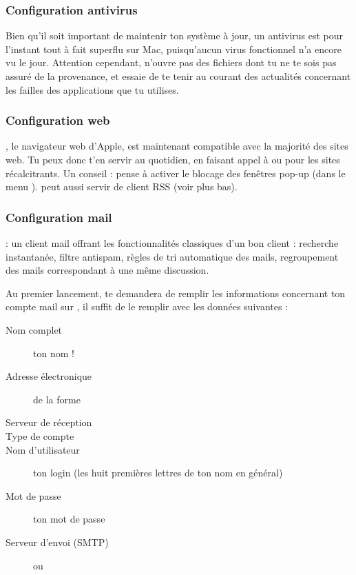
\subsubsection{Configuration antivirus}

Bien qu'il soit important de maintenir ton système à jour, un antivirus est pour l'instant tout à fait superflu sur Mac, puisqu'aucun virus fonctionnel n'a encore vu le jour. Attention cependant, n'ouvre pas des fichiers dont tu ne te sois pas assuré de la provenance, et essaie de te tenir au courant des actualités concernant les failles des applications que tu utilises.

\pagebreak

\subsubsection{Configuration web}

, le navigateur web d'Apple, est maintenant compatible avec la majorité des sites web. Tu peux donc t'en servir au quotidien, en faisant appel à  ou  pour les sites récalcitrants. Un conseil : pense à activer le blocage des fenêtres pop-up (dans le menu ).  peut aussi servir de client RSS (voir plus bas).\\

\pagebreak

\subsubsection{Configuration mail}
  : un client mail offrant les fonctionnalités classiques d'un bon client : recherche instantanée, filtre antispam, règles de tri automatique des mails, regroupement des mails correspondant à une même discussion.

Au premier lancement,  te demandera de remplir les informations concernant ton compte mail sur , il suffit de le remplir avec les données suivantes :
\begin{description}
  \item[Nom complet] ton nom !
  \item[Adresse électronique] de la forme 
  \item[Serveur de réception] 
  \item[Type de compte] 
  \item[Nom d'utilisateur] ton login  (les huit premières lettres de ton nom en général)
  \item[Mot de passe] ton mot de passe 
  \item[Serveur d'envoi (SMTP)]  ou 
\end{description}

